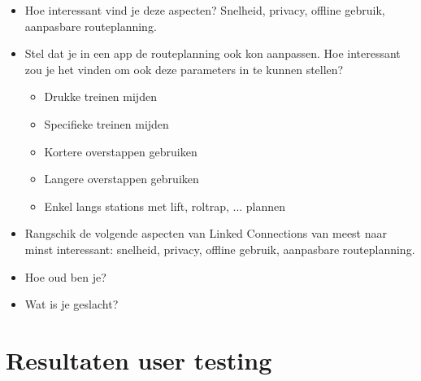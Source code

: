 \begin{appendices}
\begin{itemize}
	\item Hoe interessant vind je deze aspecten? Snelheid, privacy, offline gebruik, aanpasbare routeplanning.
	\item Stel dat je in een app de routeplanning ook kon aanpassen. Hoe interessant zou je het vinden om ook deze parameters in te kunnen stellen?
	\begin{itemize}
		\item 	Drukke treinen mijden
		\item 	Specifieke treinen mijden
		\item 	Kortere overstappen gebruiken	
		\item 	Langere overstappen gebruiken
		\item 	Enkel langs stations met lift, roltrap, ... plannen
	\end{itemize}
	\item Rangschik de volgende aspecten van Linked Connections van meest naar minst interessant: snelheid, privacy, offline gebruik, aanpasbare routeplanning.
	\item Hoe oud ben je?
	\item Wat is je geslacht?
\end{itemize}
\end{appendices}

\chapter{Resultaten user testing}
\label{appendix:usertesting}
